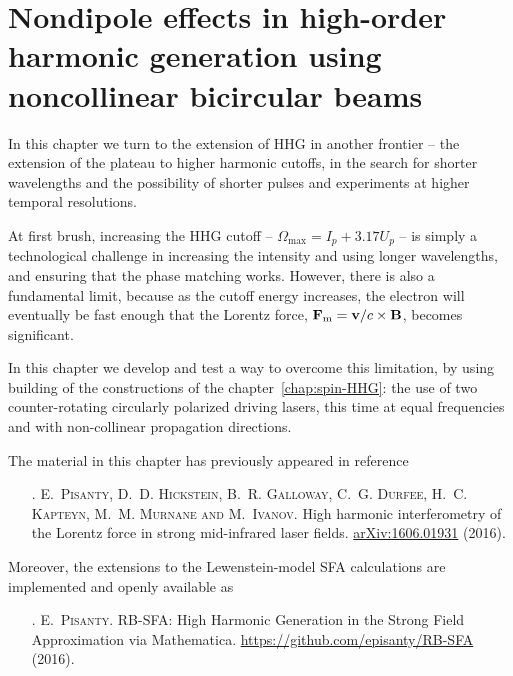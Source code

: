 

\chapter[Nondipole effects in HHG using noncollinear bicircular beams]{Nondipole effects in high-order harmonic generation using noncollinear bicircular beams}
\label{chap:nondipole-HHG}
In this chapter we turn to the extension of HHG in another frontier -- the extension of the plateau to higher harmonic cutoffs, in the search for shorter wavelengths and the possibility of shorter pulses and experiments at higher temporal resolutions. 

At first brush, increasing the HHG cutoff -- $\Omega_\mathrm{max}=I_p + 3.17U_p$ -- is simply a technological challenge in increasing the intensity and using longer wavelengths, and ensuring that the phase matching works. However, there is also a fundamental limit, because as the cutoff energy increases, the electron will eventually be fast enough that the Lorentz force, $\vb{F}_\mathrm{m}=\vb{v}/c\times\vb{B}$, becomes significant.

In this chapter we develop and test a way to overcome this limitation, by using building of the constructions of the chapter~\ref{chap:spin-HHG}: the use of two counter-rotating circularly polarized driving lasers, this time at equal frequencies and with non-collinear propagation directions.




The material in this chapter has previously appeared in reference

\begin{enumerate}
\item[{\hypersetup{citecolor=black}\citealp{Pisanty_lorentz_2016}}.]
\textsc{E.~Pisanty, D.~D. Hickstein, B.~R. Galloway, C.~G. Durfee, H.~C. Kap\-teyn, M.~M. Murnane and M.~Ivanov}.
\newblock High harmonic interferometry of the Lorentz force in strong
  mid-infrared laser fields. \href{http://arxiv.org/abs/1606.01931}{arXiv:1606.01931} (2016).
\end{enumerate}


\noindent
Moreover, the extensions to the Lewenstein-model SFA calculations are implemented and openly available as

\begin{enumerate}
\item[{\hypersetup{citecolor=black}\citealp{RB-SFA}}.]
\textsc{E.~Pisanty}. RB-SFA: High Harmonic Generation in the Strong Field Approximation via Mathematica. \url{https://github.com/episanty/RB-SFA} (2016).
\end{enumerate}





